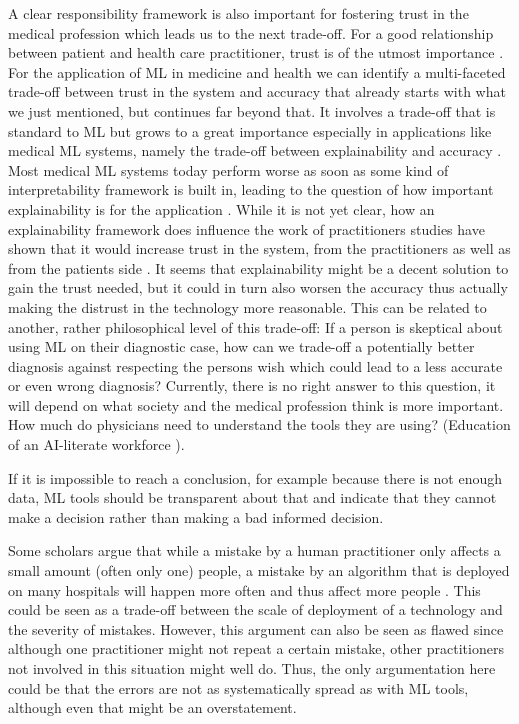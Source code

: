 A clear responsibility framework is also important for fostering trust in the medical profession which leads us to the next trade-off. For a good relationship between patient and health care practitioner, trust is of the utmost importance \cite{clark2002trust}. For the application of ML in medicine and health we can identify a multi-faceted trade-off between trust in the system and accuracy that already starts with what we just mentioned, but continues far beyond that. It involves a trade-off that is standard to ML but grows to a great importance especially in applications like medical ML systems, namely the trade-off between explainability and accuracy \cite{topol2019high, kelly2019key}. Most medical ML systems today perform worse as soon as some kind of interpretability framework is built in, leading to the question of how important explainability is for the application \cite{luo2019balancing}. While it is not yet clear, how an explainability framework does influence the work of practitioners studies have shown that it would increase trust in the system, from the practitioners as well as from the patients side \cite{diprose2020physician, topol2019high}. It seems that explainability might be a decent solution to gain the trust needed, but it could in turn also worsen the accuracy thus actually making the distrust in the technology more reasonable.
This can be related to another, rather philosophical level of this trade-off: If a person is skeptical about using ML on their diagnostic case, how can we trade-off a potentially better diagnosis against respecting the persons wish which could lead to a less accurate or even wrong diagnosis? Currently, there is no right answer to this question, it will depend on what society and the medical profession think is more important.
How much do physicians need to understand the tools they are using? (Education of an AI-literate workforce \cite{he2019practical}).

If it is impossible to reach a conclusion, for example because there is not enough data, ML tools should be transparent about that and indicate that they cannot make a decision rather than making a bad informed decision.  \cite{horgan2019artificial}



Some scholars argue that while a mistake by a human practitioner only affects a small amount (often only one) people, a mistake by an algorithm that is deployed on many hospitals will happen more often and thus affect more people \cite{Morley2020}. This could be seen as a trade-off between the scale of deployment of a technology and the severity of mistakes. However, this argument can also be seen as flawed since although one practitioner might not repeat a certain mistake, other practitioners not involved in this situation might well do. Thus, the only argumentation here could be that the errors are not as systematically spread as with ML tools, although even that might be an overstatement.


